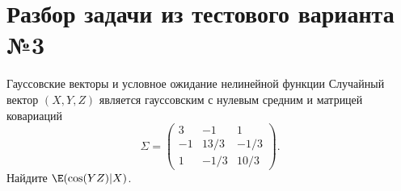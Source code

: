 \section*{Разбор задачи из тестового варианта №3}
\begin{Task}{Гауссовские векторы и условное ожидание нелинейной функции}{}
    Случайный вектор $(X, Y, Z)$ является гауссовским с нулевым средним и матрицей ковариаций
    \[
    \Sigma = \begin{pmatrix} 
    3 & -1 & 1 \\ 
    -1 & 13/3 & -1/3 \\ 
    1 & -1/3 & 10/3 
    \end{pmatrix}.
    \]
    Найдите $\E(\cos(YZ)|X)$.
\end{Task}


